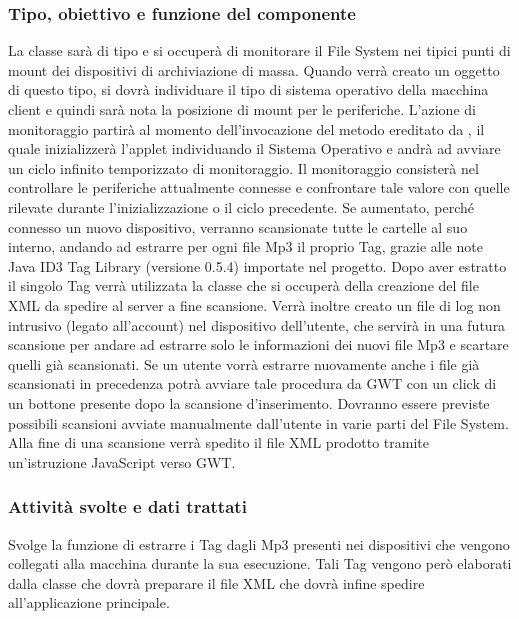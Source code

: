 \subsubsection*{Tipo, obiettivo e funzione del componente} La classe
 sar\`a di tipo  e si occuper\`a di monitorare il
File System nei tipici punti di mount dei dispositivi di archiviazione di massa.
Quando verr\`a creato un oggetto di questo tipo, si dovr\`a individuare il tipo
di sistema operativo della macchina client e quindi sar\`a nota la posizione di
mount per le periferiche. L'azione di monitoraggio partir\`a al momento
dell'invocazione del metodo  ereditato da , il quale
inizializzer\`a l'applet individuando il Sistema Operativo e andr\`a ad avviare
un ciclo infinito temporizzato di monitoraggio. Il monitoraggio consister\`a nel
controllare le periferiche attualmente connesse e confrontare tale valore con
quelle rilevate durante l'inizializzazione o il ciclo precedente. Se aumentato,
perch\'e connesso un nuovo dispositivo, verranno scansionate tutte le cartelle
al suo interno, andando ad estrarre per ogni file Mp3 il proprio Tag, grazie
alle note Java ID3 Tag Library (versione 0.5.4) importate nel progetto. Dopo
aver estratto il singolo Tag verr\`a utilizzata la classe  che
si occuper\`a della creazione del file XML da spedire al server a fine
scansione. Verr\`a inoltre creato un file di log non intrusivo (legato
all'account) nel dispositivo dell'utente, che servir\`a in una futura scansione
per andare ad estrarre solo le informazioni dei nuovi file Mp3 e scartare quelli
gi\`a scansionati. Se un utente vorr\`a estrarre nuovamente anche i file gi\`a
scansionati in precedenza potr\`a avviare tale procedura da GWT con un click di
un bottone presente dopo la scansione d'inserimento. Dovranno essere previste
possibili scansioni avviate manualmente dall'utente in varie parti del File
System. Alla fine di una scansione verr\`a spedito il file XML prodotto tramite
un'istruzione JavaScript verso GWT.
\subsubsection*{Attivit\`a svolte e dati trattati}
Svolge la funzione di estrarre i Tag dagli Mp3 presenti nei dispositivi che
vengono collegati alla macchina durante la sua esecuzione. Tali Tag vengono
per\`o elaborati dalla classe  che dovr\`a preparare il file
XML che  dovr\`a infine spedire all'applicazione principale.\\
\\

